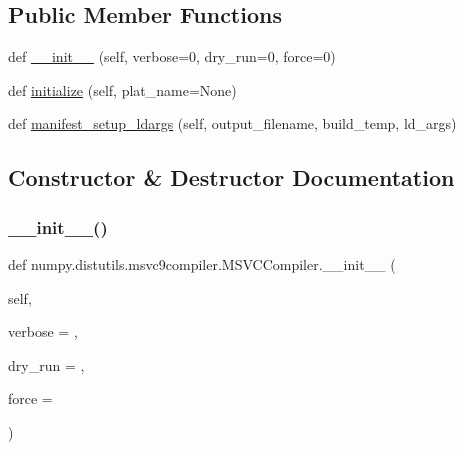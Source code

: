 \subsection*{Public Member Functions}
\begin{DoxyCompactItemize}
\item 
def \hyperlink{classnumpy_1_1distutils_1_1msvc9compiler_1_1MSVCCompiler_a81e7a807ed879a0b29eda074d3f2a31d}{\+\_\+\+\_\+init\+\_\+\+\_\+} (self, verbose=0, dry\+\_\+run=0, force=0)
\item 
def \hyperlink{classnumpy_1_1distutils_1_1msvc9compiler_1_1MSVCCompiler_a371a3a61de1df7810d9d9de0d8821ceb}{initialize} (self, plat\+\_\+name=None)
\item 
def \hyperlink{classnumpy_1_1distutils_1_1msvc9compiler_1_1MSVCCompiler_a8a0a8a345aeebe31e62ffa11b1123aea}{manifest\+\_\+setup\+\_\+ldargs} (self, output\+\_\+filename, build\+\_\+temp, ld\+\_\+args)
\end{DoxyCompactItemize}


\subsection{Constructor \& Destructor Documentation}
\mbox{\label{classnumpy_1_1distutils_1_1msvc9compiler_1_1MSVCCompiler_a81e7a807ed879a0b29eda074d3f2a31d}} 
\subsubsection{\texorpdfstring{\+\_\+\+\_\+init\+\_\+\+\_\+()}{\_\_init\_\_()}}
{\footnotesize\ttfamily def numpy.\+distutils.\+msvc9compiler.\+M\+S\+V\+C\+Compiler.\+\_\+\+\_\+init\+\_\+\+\_\+ (\begin{DoxyParamCaption}\item[{}]{self,  }\item[{}]{verbose = {},  }\item[{}]{dry\+\_\+run = {},  }\item[{}]{force = {} }\end{DoxyParamCaption})}



